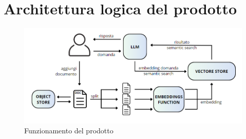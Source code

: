 \section{Architettura logica del prodotto} \label{sec:archlogica}

\begin{figure}[h!]
    \centering  
    \includegraphics[width=\textwidth]{archlogic.png}
    \caption{Funzionamento del prodotto}
\end{figure}

